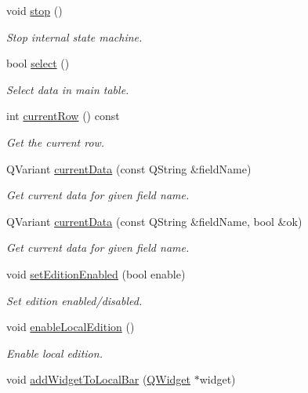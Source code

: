 \begin{DoxyCompactItemize}
void \hyperlink{classmdt_sql_table_widget_a071ab9cd7de514a8ba4341234fefce64}{stop} ()
\begin{DoxyCompactList}\small\item\em Stop internal state machine. \end{DoxyCompactList}\item 
bool \hyperlink{classmdt_sql_table_widget_af276a4ddd2d0effd26f979a0bcad9b82}{select} ()
\begin{DoxyCompactList}\small\item\em Select data in main table. \end{DoxyCompactList}\item 
int \hyperlink{classmdt_sql_table_widget_a7612cf9cb10c69365b7ed820d71e6cb2}{current\-Row} () const 
\begin{DoxyCompactList}\small\item\em Get the current row. \end{DoxyCompactList}\item 
Q\-Variant \hyperlink{classmdt_sql_table_widget_a13d3d5db07aedf14265a36c5ff2ad7cb}{current\-Data} (const Q\-String \&field\-Name)
\begin{DoxyCompactList}\small\item\em Get current data for given field name. \end{DoxyCompactList}\item 
Q\-Variant \hyperlink{classmdt_sql_table_widget_a02015aa0da93113547615cd951278042}{current\-Data} (const Q\-String \&field\-Name, bool \&ok)
\begin{DoxyCompactList}\small\item\em Get current data for given field name. \end{DoxyCompactList}\item 
void \hyperlink{classmdt_sql_table_widget_af5ef66b8ebb45a698f99ad455208f3c8}{set\-Edition\-Enabled} (bool enable)
\begin{DoxyCompactList}\small\item\em Set edition enabled/disabled. \end{DoxyCompactList}\item 
void \hyperlink{classmdt_sql_table_widget_a39422fb9522ee73513f13d8bcb91a143}{enable\-Local\-Edition} ()
\begin{DoxyCompactList}\small\item\em Enable local edition. \end{DoxyCompactList}\item 
void \hyperlink{classmdt_sql_table_widget_a9c0ae7b87d1840f2fdcee6de763fe31a}{add\-Widget\-To\-Local\-Bar} (\hyperlink{class_q_widget}{Q\-Widget} $\ast$widget)

\end{DoxyCompactItemize}
